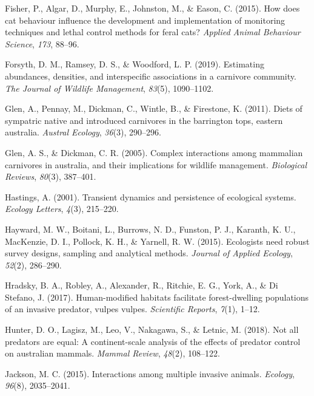 \documentclass[]{elsarticle} %
\begin{document}
\leavevmode\hypertarget{ref-fisher2015}{}%
Fisher, P., Algar, D., Murphy, E., Johnston, M., \& Eason, C. (2015). How does cat behaviour influence the development and implementation of monitoring techniques and lethal control methods for feral cats? \emph{Applied Animal Behaviour Science}, \emph{173}, 88--96.

\leavevmode\hypertarget{ref-forsyth2019}{}%
Forsyth, D. M., Ramsey, D. S., \& Woodford, L. P. (2019). Estimating abundances, densities, and interspecific associations in a carnivore community. \emph{The Journal of Wildlife Management}, \emph{83}(5), 1090--1102.

\leavevmode\hypertarget{ref-glen2011}{}%
Glen, A., Pennay, M., Dickman, C., Wintle, B., \& Firestone, K. (2011). Diets of sympatric native and introduced carnivores in the barrington tops, eastern australia. \emph{Austral Ecology}, \emph{36}(3), 290--296.

\leavevmode\hypertarget{ref-glen2005}{}%
Glen, A. S., \& Dickman, C. R. (2005). Complex interactions among mammalian carnivores in australia, and their implications for wildlife management. \emph{Biological Reviews}, \emph{80}(3), 387--401.

\leavevmode\hypertarget{ref-hastings2001}{}%
Hastings, A. (2001). Transient dynamics and persistence of ecological systems. \emph{Ecology Letters}, \emph{4}(3), 215--220.

\leavevmode\hypertarget{ref-hayward2015}{}%
Hayward, M. W., Boitani, L., Burrows, N. D., Funston, P. J., Karanth, K. U., MacKenzie, D. I., Pollock, K. H., \& Yarnell, R. W. (2015). Ecologists need robust survey designs, sampling and analytical methods. \emph{Journal of Applied Ecology}, \emph{52}(2), 286--290.

\leavevmode\hypertarget{ref-hradsky2017human}{}%
Hradsky, B. A., Robley, A., Alexander, R., Ritchie, E. G., York, A., \& Di Stefano, J. (2017). Human-modified habitats facilitate forest-dwelling populations of an invasive predator, vulpes vulpes. \emph{Scientific Reports}, \emph{7}(1), 1--12.

\leavevmode\hypertarget{ref-hunter2018}{}%
Hunter, D. O., Lagisz, M., Leo, V., Nakagawa, S., \& Letnic, M. (2018). Not all predators are equal: A continent-scale analysis of the effects of predator control on australian mammals. \emph{Mammal Review}, \emph{48}(2), 108--122.

\leavevmode\hypertarget{ref-jackson2015}{}%
Jackson, M. C. (2015). Interactions among multiple invasive animals. \emph{Ecology}, \emph{96}(8), 2035--2041.
\end{document}
